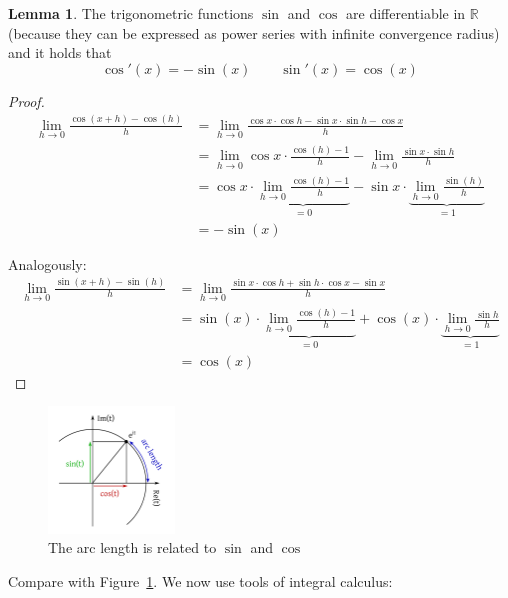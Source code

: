 \documentclass[a4paper,landscape,twocolumn]{article}
\theoremstyle{definition}
\newtheorem{lemma}{Lemma}
\begin{document}
\begin{lemma}
  The trigonometric functions $\sin$ and $\cos$ are differentiable in $\mathbb R$
  (because they can be expressed as power series with infinite convergence radius)
  and it holds that
  \[ \cos'(x) = -\sin(x)  \qquad  \sin'(x) = \cos(x) \]
\end{lemma}
\begin{proof}
  \begin{align*}
    \lim_{h\to0} \frac{\cos(x + h) - \cos(h)}{h}
      &= \lim_{h\to0} \frac{\cos{x} \cdot \cos{h} - \sin{x} \cdot \sin{h} - \cos{x}}{h} \\
      &= \lim_{h\to0} \cos{x} \cdot \frac{\cos(h) - 1}{h} - \lim_{h\to0} \frac{\sin{x} \cdot \sin{h}}{h} \\
      &= \cos{x} \cdot \underbrace{\lim_{h\to0} \frac{\cos(h) - 1}{h}}_{=0} - \sin{x} \cdot \underbrace{\lim_{h\to0} \frac{\sin(h)}{h}}_{=1} \\
      &= -\sin(x)
  \end{align*}

  Analogously:
  \begin{align*}
    \lim_{h\to0} \frac{\sin(x + h) - \sin(h)}{h}
      &= \lim_{h\to0} \frac{\sin{x} \cdot \cos{h} + \sin{h} \cdot \cos{x} - \sin{x}}{h} \\
      &= \sin(x) \cdot \underbrace{\lim_{h\to0} \frac{\cos(h) - 1}{h}}_{=0} + \cos(x) \cdot \underbrace{\lim_{h\to0} \frac{\sin{h}}{h}}_{=1} \\
      &= \cos(x)
  \end{align*}
\end{proof}
\begin{figure}[!h]
  \begin{center}
    \includegraphics[width=0.3\textwidth]{img/arclength_on_unitcircle.pdf}
    \caption{The arc length is related to $\sin$ and $\cos$}
    \label{img:arc-length}
  \end{center}
\end{figure}

Compare with Figure~\ref{img:arc-length}. We now use tools of integral calculus:
\end{document}
